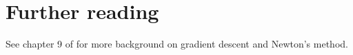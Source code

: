 \documentclass[11pt,nocut]{article}
\begin{document}


\section*{Further reading}

See chapter 9 of \cite{boyd2004convex} for more background on gradient descent and Newton's method.

\vspace{1cm}
\centerline{}




\end{document}
